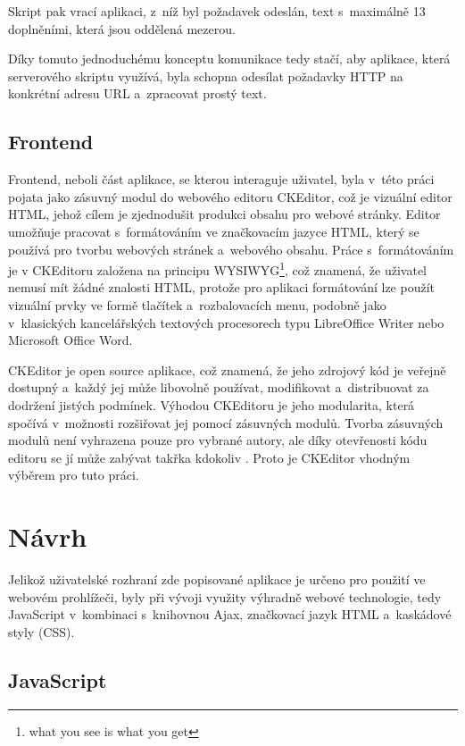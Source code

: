 \documentclass[a4paper,11pt,openany]{book} %
\begin{document}
Skript pak vrací aplikaci, z~níž byl požadavek odeslán, text s~maximálně 13 doplněními, která jsou oddělená mezerou.

Díky tomuto jednoduchému konceptu komunikace tedy stačí, aby aplikace, která serverového skriptu využívá, byla schopna odesílat požadavky HTTP na konkrétní adresu URL a~zpracovat prostý text. 

\section{Frontend}

Frontend, neboli část aplikace, se kterou interaguje uživatel, byla v~této práci pojata jako zásuvný modul do webového editoru CKEditor, což je vizuální editor HTML, jehož cílem je zjednodušit produkci obsahu pro webové stránky. Editor umožňuje pracovat s~formátováním ve značkovacím jazyce HTML, který se používá pro tvorbu webových stránek a~webového obsahu. Práce s~formátováním je v CKEditoru založena na principu WYSIWYG\footnote{what you see is what you get}, což znamená, že uživatel nemusí mít žádné znalosti HTML, protože pro aplikaci formátování lze použít vizuální prvky ve formě tlačítek a~rozbalovacích menu, podobně jako v~klasických kancelářských textových procesorech typu LibreOffice Writer nebo Microsoft Office Word.

CKEditor je open source aplikace, což znamená, že jeho zdrojový kód je veřejně dostupný a~každý jej může libovolně používat, modifikovat a~distribuovat za dodržení jistých podmínek. Výhodou CKEditoru je jeho modularita, která spočívá v~možnosti rozšiřovat jej pomocí zásuvných modulů. Tvorba zásuvných modulů není vyhrazena pouze pro vybrané autory, ale  díky otevřenosti kódu editoru se jí může zabývat takřka kdokoliv \parencite{cksource2015}. Proto je CKEditor vhodným výběrem pro tuto práci. %

\chapter{Návrh}\label{navrh}

Jelikož uživatelské rozhraní zde popisované aplikace je určeno pro použití ve webovém prohlížeči, byly při vývoji využity výhradně webové technologie, tedy JavaScript v~kombinaci s~knihovnou Ajax, značkovací jazyk HTML a~kaskádové styly (CSS). 

\section{JavaScript}
\end{document}
